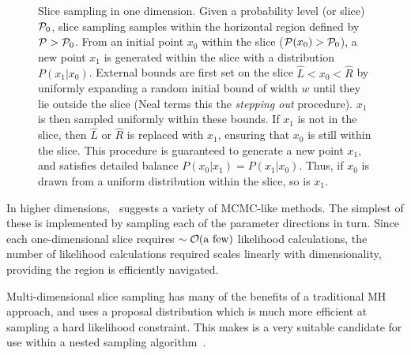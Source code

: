 \begin{figure}[tp]
  \caption{Slice sampling in one dimension. 
    Given a probability level (or slice) \(\mathcal{P}_0\), slice sampling samples within the horizontal region defined by \(\mathcal{P}>\mathcal{P}_0\). 
    From an initial point \(x_0\) within the slice (\(\mathcal{P}(x_0)>\mathcal{P}_0\)), a new point \(x_1\) is generated within the slice with a distribution \(P(x_1|x_0)\).
    External bounds are first set on the slice \(\hat{L}<x_0<\hat{R}\) by uniformly expanding a random initial bound of width \(w\) until they lie outside the slice (Neal terms this the {\em stepping out\/} procedure). 
    \(x_1\) is then sampled uniformly within these bounds.  
    If \(x_1\) is not in the slice, then \(\hat{L}\) or \(\hat{R}\) is replaced with \(x_1\), ensuring that \(x_0\) is still within the slice.
    This procedure is guaranteed to generate a new point \(x_1\), and satisfies detailed balance \(P(x_0|x_1) = P(x_1|x_0)\). Thus, if \(x_0\) is drawn from a uniform distribution within the slice, so is \(x_1\).\label{fig:bay:1d_slice}
  }
\end{figure}

In higher dimensions,~\cite{NealSlice} suggests a variety of MCMC-like methods. The simplest of these is implemented by sampling each of the parameter directions in turn. Since each one-dimensional slice requires \({\sim\mathcal{O}{\left(\text{a few}\right)}}\) likelihood calculations, the number of likelihood calculations required scales linearly with dimensionality, providing the region is efficiently navigated. 

Multi-dimensional slice sampling has many of the benefits of a traditional MH approach, and uses a proposal distribution which is much more efficient at sampling a hard likelihood constraint. This makes is a very suitable candidate for use within a nested sampling algorithm~\citep{skilling2006}.



